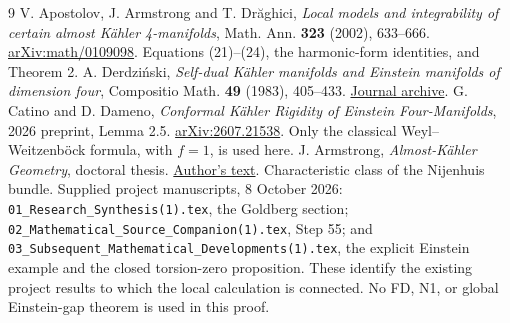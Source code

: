 \documentclass[11pt]{article}
\theoremstyle{remark}\newtheorem{remark}[theorem]{Remark}
\begin{document}
\begin{thebibliography}{9}
V. Apostolov, J. Armstrong and T. Dr\u aghici,
\emph{Local models and integrability of certain almost K\"ahler 4-manifolds},
Math. Ann. \textbf{323} (2002), 633--666.
\href{https://arxiv.org/abs/math/0109098}{arXiv:math/0109098}.
Equations (21)--(24), the harmonic-form identities, and Theorem 2.
A. Derdzi\'nski,
\emph{Self-dual K\"ahler manifolds and Einstein manifolds of dimension four},
Compositio Math. \textbf{49} (1983), 405--433.
\href{https://archive.numdam.org/item/CM_1983__49_3_405_0/}{Journal archive}.
G. Catino and D. Dameno,
\emph{Conformal K\"ahler Rigidity of Einstein Four-Manifolds},
2026 preprint, Lemma 2.5.
\href{https://arxiv.org/abs/2607.21538}{arXiv:2607.21538}.
Only the classical Weyl--Weitzenb\"ock formula, with $f=1$, is used here.
J. Armstrong, \emph{Almost-K\"ahler Geometry}, doctoral thesis.
\href{https://johnarmstrongmaths.com/publications/resources/thesis.pdf}{Author's text}.
Characteristic class of the Nijenhuis bundle.
Supplied project manuscripts, 8 October 2026:
\texttt{01\_Research\_Synthesis(1).tex}, the Goldberg section;
\texttt{02\_Mathematical\_Source\_Companion(1).tex}, Step 55;
and \texttt{03\_Subsequent\_Mathematical\_Developments(1).tex},
the explicit Einstein example and the closed torsion-zero proposition.
These identify the existing project results to which the local calculation
is connected. No FD, N1, or global Einstein-gap theorem is used in this proof.
\end{thebibliography}
\end{document}
